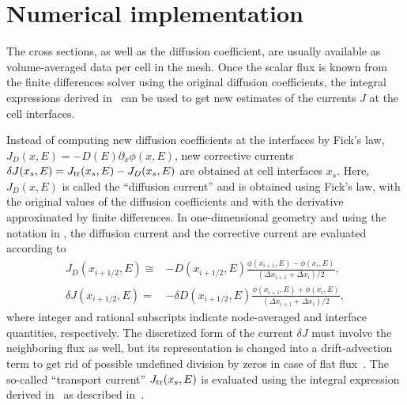 %
\section{Numerical implementation}
\label{sec:imp}

The cross sections, as well as the diffusion coefficient, are usually available as volume-averaged data per cell in the mesh. Once the scalar flux is known from the finite differences solver using the original diffusion coefficients, the integral expressions derived in~ can be used to get new estimates of the currents $J$ at the cell interfaces. 

Instead of computing new diffusion coefficients at the interfaces by Fick's law, $J_D(x,E) = -D(E) \partial_x \phi(x,E)$, new corrective currents $\delta J(x_s,E) = J_{\textrm{\scriptsize{tr}}}(x_s,E) - J_D(x_s,E)$ are obtained at cell interfaces $x_s$. Here, $J_D(x,E)$ is called the ``diffusion current'' and is obtained using Fick's law, with the original values of the diffusion coefficients and with the derivative approximated by finite differences. In one-dimensional 
geometry and using the notation in , the diffusion current and the corrective current are evaluated according to
\begin{subequations}\label{eq:JD-dJ}
\begin{align}
J_D(x_{i+1/2},E) \cong& -D(x_{i+1/2},E) 
\frac{\phi(x_{i+1},E) - \phi(x_i,E)}
{(\Delta x_{i+1} + \Delta x_i)/2}, \label{eq:JD} \\
\delta J(x_{i+1/2},E) =& -\delta D(x_{i+1/2},E) 
\frac{\phi(x_{i+1},E) + \phi(x_i,E)}
{(\Delta x_{i+1} + \Delta x_i)/2}, \label{eq:dJ}
\end{align}
\end{subequations}
where integer and rational subscripts indicate node-averaged and interface quantities, respectively. The discretized form of the current $\delta J$ must involve the neighboring flux as well, but its representation is changed into a drift-advection term to get rid of possible undefined division by zeros in case of flat flux~\cite{Smith-1983,Tomatis-2011}. The so-called ``transport current'' $J_{\textrm{\scriptsize{tr}}}(x_s,E)$ is evaluated using the integral expression derived in~ as described in~.

